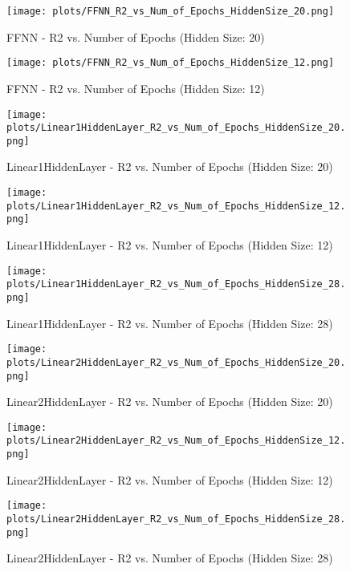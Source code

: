 \begin{figure}[H]
    \centering
    \texttt{[image: plots/FFNN\_R2\_vs\_Num\_of\_Epochs\_HiddenSize\_20.png]}
    \caption{FFNN - R2 vs. Number of Epochs (Hidden Size: 20)}
\end{figure}

\begin{figure}[H]
    \centering
    \texttt{[image: plots/FFNN\_R2\_vs\_Num\_of\_Epochs\_HiddenSize\_12.png]}
    \caption{FFNN - R2 vs. Number of Epochs (Hidden Size: 12)}
\end{figure}

\begin{figure}[H]
    \centering
    \texttt{[image: plots/Linear1HiddenLayer\_R2\_vs\_Num\_of\_Epochs\_HiddenSize\_20.png]}
    \caption{Linear1HiddenLayer - R2 vs. Number of Epochs (Hidden Size: 20)}
\end{figure}

\begin{figure}[H]
    \centering
    \texttt{[image: plots/Linear1HiddenLayer\_R2\_vs\_Num\_of\_Epochs\_HiddenSize\_12.png]}
    \caption{Linear1HiddenLayer - R2 vs. Number of Epochs (Hidden Size: 12)}
\end{figure}

\begin{figure}[H]
    \centering
    \texttt{[image: plots/Linear1HiddenLayer\_R2\_vs\_Num\_of\_Epochs\_HiddenSize\_28.png]}
    \caption{Linear1HiddenLayer - R2 vs. Number of Epochs (Hidden Size: 28)}
\end{figure}

\begin{figure}[H]
    \centering
    \texttt{[image: plots/Linear2HiddenLayer\_R2\_vs\_Num\_of\_Epochs\_HiddenSize\_20.png]}
    \caption{Linear2HiddenLayer - R2 vs. Number of Epochs (Hidden Size: 20)}
\end{figure}

\begin{figure}[H]
    \centering
    \texttt{[image: plots/Linear2HiddenLayer\_R2\_vs\_Num\_of\_Epochs\_HiddenSize\_12.png]}
    \caption{Linear2HiddenLayer - R2 vs. Number of Epochs (Hidden Size: 12)}
\end{figure}

\begin{figure}[H]
    \centering
    \texttt{[image: plots/Linear2HiddenLayer\_R2\_vs\_Num\_of\_Epochs\_HiddenSize\_28.png]}
    \caption{Linear2HiddenLayer - R2 vs. Number of Epochs (Hidden Size: 28)}
\end{figure}

